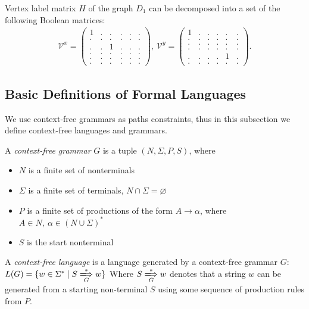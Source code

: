 Vertex label matrix $H$ of the graph $D_1$ can be decomposed into a set of the following Boolean matrices:
{
    \renewcommand{\arraystretch}{0.7}
    \setlength\arraycolsep{2pt}
\begin{align*}
\mathcal{V}^x =
\begin{pmatrix}
    1 & . & . & . & . & . \\
    . & . & . & . & . & . \\
    . & . & 1 & . & . & . \\
    . & . & . & . & . & . \\
    . & . & . & . & . & . \\
    . & . & . & . & . & .
\end{pmatrix},~
\mathcal{V}^y =
\begin{pmatrix}
    1 & . & . & . & . & . \\
    . & . & . & . & . & . \\
    . & . & . & . & . & . \\
    . & . & . & . & . & . \\
    . & . & . & . & 1 & . \\
    . & . & . & . & . & .
\end{pmatrix}.
\end{align*}
}

\subsection{Basic Definitions of Formal Languages}
We use context-free grammars as paths constraints, thus in this subsection we define context-free languages and grammars.

\begin{definition}A \emph{context-free grammar} $G$ is a tuple $(N, \Sigma, P, S)$, where
\begin{itemize}
    \item $N$ is a finite set of nonterminals
    \item $\Sigma$ is a finite set of terminals, $N \cap \Sigma = \varnothing$
    \item $P$ is a finite set of productions of the form $A \to \alpha$, where $A \in N,\ \alpha \in (N \cup \Sigma)^*$
    \item $S$ is the start nonterminal
\end{itemize} 
\end{definition}

\begin{definition} A \emph{context-free language} is a language generated by a context-free grammar $G$:
  $   L(G) = \{w \in \Sigma^* \mid S \xLongrightarrow[G]{*} w \}$
Where $S \xLongrightarrow[G]{*} w$  denotes that a string $w$ can be generated from a starting non-terminal $S$ using some sequence of production rules from $P$.
\end{definition}

